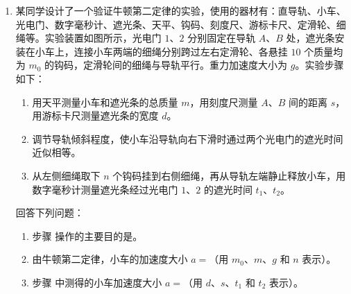 \begin{enumerate}

\item
某同学设计了一个验证牛顿第二定律的实验，使用的器材有：直导轨、小车、光电门、数字毫秒计、遮光条、天平、钩码、刻度尺、游标卡尺、定滑轮、细绳等。实验装置如图所示，光电门 $ 1 $、$ 2 $ 分别固定在导轨 $ A $、$ B $ 处，遮光条安装在小车上，连接小车两端的细绳分别跨过左右定滑轮、各悬挂 $ 10 $ 个质量均为 $ m_{0} $ 的钩码，定滑轮间的细绳与导轨平行。重力加速度大小为 $ g $。实验步骤如下：
\begin{figure}[htbp]
\centering

\end{figure}
\begin{enumerate}[label=\roman*.]
	\item 
	用天平测量小车和遮光条的总质量 $ m $，用刻度尺测量 $ A $、$ B $ 间的距离 $ s $，用游标卡尺测量遮光条的宽度 $ d $。
	\item 
	调节导轨倾斜程度，使小车沿导轨向右下滑时通过两个光电门的遮光时间近似相等。
	\item 
	从左侧细绳取下 $ n $ 个钩码挂到右侧细绳，再从导轨左端静止释放小车，用数字毫秒计测量遮光条经过光电门 $ 1 $、$ 2 $ 的遮光时间 $ t_{1} $、$ t_{2} $。
\end{enumerate}
回答下列问题：
\begin{enumerate}
	\item 
	步骤  操作的主要目的是。
	
	\item
	由牛顿第二定律，小车的加速度大小 $ a =$（用 $ m_{0} $、$ m $、$ g $ 和 $ n $ 表示）。
	
	\item
	步骤  中测得的小车加速度大小 $ a =$（用 $ d $、$ s $、$ t_{1} $ 和 $ t_{2} $ 表示）。
	

\end{enumerate}
\end{enumerate}
